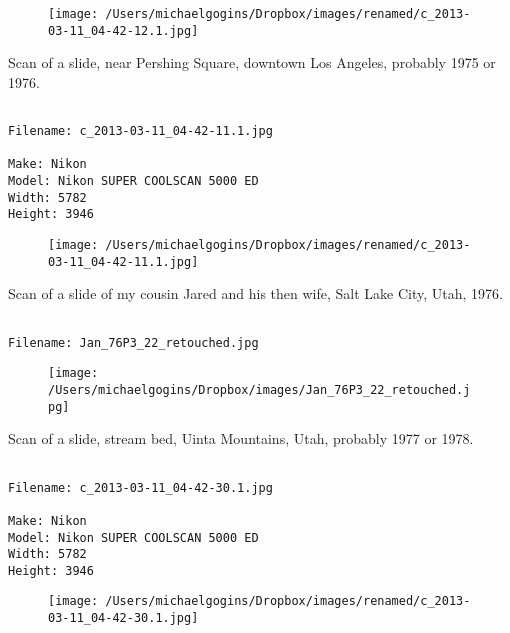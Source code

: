 \begin{figure}
\texttt{[image: /Users/michaelgogins/Dropbox/images/renamed/c\_2013-03-11\_04-42-12.1.jpg]}
\end{figure}
    
\clearpage
\onecolumn
\noindent Scan of a slide, near Pershing Square, downtown Los Angeles, probably 1975 or 1976.
\noindent
\begin{lstlisting}

Filename: c_2013-03-11_04-42-11.1.jpg

Make: Nikon
Model: Nikon SUPER COOLSCAN 5000 ED
Width: 5782
Height: 3946
\end{lstlisting}
\clearpage

\begin{figure}
\texttt{[image: /Users/michaelgogins/Dropbox/images/renamed/c\_2013-03-11\_04-42-11.1.jpg]}
\end{figure}
    
\clearpage
\onecolumn
\noindent Scan of a slide of my cousin Jared and his then wife, Salt Lake City, Utah, 1976.
\noindent
\begin{lstlisting}

Filename: Jan_76P3_22_retouched.jpg

\end{lstlisting}
\clearpage

\begin{figure}
\texttt{[image: /Users/michaelgogins/Dropbox/images/Jan\_76P3\_22\_retouched.jpg]}
\end{figure}
    
\clearpage
\onecolumn
\noindent Scan of a slide, stream bed, Uinta Mountains, Utah, probably 1977 or 1978.
\noindent
\begin{lstlisting}

Filename: c_2013-03-11_04-42-30.1.jpg

Make: Nikon
Model: Nikon SUPER COOLSCAN 5000 ED
Width: 5782
Height: 3946
\end{lstlisting}
\clearpage

\begin{figure}
\texttt{[image: /Users/michaelgogins/Dropbox/images/renamed/c\_2013-03-11\_04-42-30.1.jpg]}
\end{figure}
    
